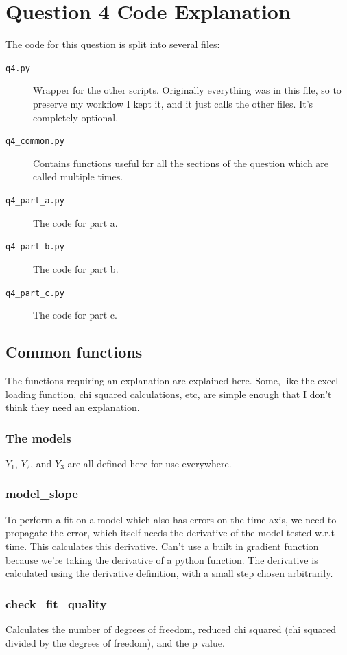 \clearpage
\section{Question 4 Code Explanation}\label{q4code}
The code for this question is split into several files:
\begin{description}
    \item[\texttt{q4.py}] Wrapper for the other scripts. Originally everything was in this file, so to preserve my workflow I kept it, and it just calls the other files. It's completely optional.
    \item[\texttt{q4\_common.py}] Contains functions useful for all the sections of the question which are called multiple times.
    \item[\texttt{q4\_part\_a.py}] The code for part a.
    \item[\texttt{q4\_part\_b.py}] The code for part b.
    \item[\texttt{q4\_part\_c.py}] The code for part c.
\end{description}
\subsection{Common functions}
The functions requiring an explanation are explained here. Some, like the excel loading function, chi squared calculations, etc, are simple enough that I don't think they need an explanation.
\subsubsection{The models}
\(Y_1\), \(Y_2\), and \(Y_3\) are all defined here for use everywhere.
\subsubsection{model\_slope}
To perform a fit on a model which also has errors on the time axis, we need to propagate the error, which itself needs the derivative of the model tested w.r.t time. This calculates this derivative. Can't use a built in gradient function because we're taking the derivative of a python function. The derivative is calculated using the derivative definition, with a small step chosen arbitrarily.
\subsubsection{check\_fit\_quality}
Calculates the number of degrees of freedom, reduced chi squared (chi squared divided by the degrees of freedom), and the p value.
